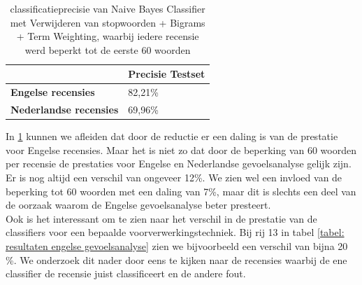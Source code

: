 \begin{table}[h]
\centering
\begin{tabular}{l|l|}
\cline{2-2}
                                                  & {\bf Precisie Testset} \\ \hline
\multicolumn{1}{|l|}{{\bf Engelse recensies}}     & 82,21\%                \\ \hline
\multicolumn{1}{|l|}{{\bf Nederlandse recensies}} & 69,96\%                \\ \hline
\end{tabular}
\caption{classificatieprecisie van Naive Bayes Classifier met Verwijderen van stopwoorden + Bigrams + Term Weighting, waarbij iedere recensie werd beperkt tot de eerste 60 woorden}
\label{tabel: beperking tot 60 woorden}
\end{table}

In \ref{tabel: beperking tot 60 woorden} kunnen we afleiden dat door de reductie er een daling is van de prestatie voor Engelse recensies. Maar het is niet zo dat door de beperking van 60 woorden per recensie de prestaties voor Engelse en Nederlandse gevoelsanalyse gelijk zijn. Er is nog altijd een verschil van ongeveer 12\%. We zien wel een invloed van de beperking tot 60 woorden met een daling van 7\%, maar dit is slechts een deel van de oorzaak waarom de Engelse gevoelsanalyse beter presteert.\\

Ook is het interessant om te zien naar het verschil in de prestatie van de classifiers voor een bepaalde voorverwerkingstechniek. Bij rij 13 in tabel \ref{tabel: resultaten engelse gevoelsanalyse} zien we bijvoorbeeld een verschil van bijna 20 \%. We onderzoek dit nader door eens te kijken naar de recensies waarbij de ene classifier de recensie juist classificeert en de andere fout.

